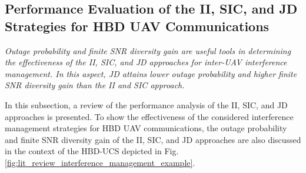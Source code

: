 \subsection{Performance Evaluation of the II, SIC, and JD Strategies for HBD UAV Communications}
\begin{summary} \emph{
\emph{Outage probability and finite SNR diversity gain are useful tools in determining the effectiveness of the II, SIC, and JD approaches for inter-UAV interference management. In this aspect, JD attains lower outage probability and higher finite SNR diversity gain than the II and SIC approach.
}}
\end{summary}

In this subsection, a review of the performance analysis of the II, SIC, and JD approaches is presented. To show the effectiveness of the considered interference management strategies for HBD UAV communications, the outage probability and finite SNR diversity gain of the II, SIC, and JD approaches are also discussed in the context of the HBD-UCS depicted in Fig. \ref{fig:lit_review_interference_management_example}. 

